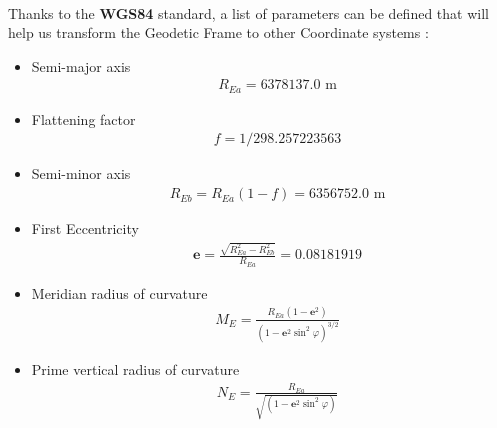 \paragraph{}Thanks to the \textbf{WGS84} standard, a list of parameters can be defined that will help us transform the Geodetic Frame to other Coordinate systems \cite{Hothem88}:

\begin{itemize}
\item{Semi-major axis\\
\begin{align*}
& R_{Ea} = 6378137.0 \text{ m}
\end{align*}}
\item{Flattening factor\\
\begin{align*}
& f = 1/298.257223563 
\end{align*}}
\item{Semi-minor axis \\
\begin{align*}
& R_{Eb} = R_{Ea}(1-f) = 6356752.0 \text{ m}
\end{align*}}
\item{First Eccentricity \\
\begin{align*}
& \textbf{e} = \frac{\sqrt{R_{Ea}^2-R_{Eb}^2}}{R_{Ea}} = 0.08181919
\end{align*}}
\item{Meridian radius of curvature \\
\begin{align*}
& M_{E} = \frac{R_{Ea}(1-\textbf{e}^2)}{(1-\textbf{e}^2\sin^2\varphi)^{3/2}} 
\end{align*}}
\item{Prime vertical radius of curvature \\
\begin{align*}
& N_{E} = \frac{R_{Ea}}{\sqrt{(1-\textbf{e}^2\sin^2\varphi)}}
\end{align*}}
\end{itemize}
